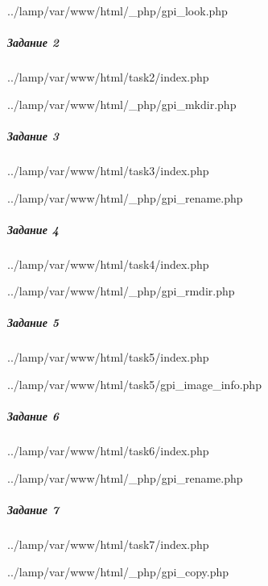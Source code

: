 
{../lamp/var/www/html/_php/gpi_look.php}


\subparagraph{Задание 2} \hspace{0pt}


{../lamp/var/www/html/task2/index.php}


{../lamp/var/www/html/_php/gpi_mkdir.php}


\subparagraph{Задание 3} \hspace{0pt}


{../lamp/var/www/html/task3/index.php}


{../lamp/var/www/html/_php/gpi_rename.php}


\subparagraph{Задание 4} \hspace{0pt}


{../lamp/var/www/html/task4/index.php}


{../lamp/var/www/html/_php/gpi_rmdir.php}


\subparagraph{Задание 5} \hspace{0pt}


{../lamp/var/www/html/task5/index.php}


{../lamp/var/www/html/task5/gpi_image_info.php}


\subparagraph{Задание 6} \hspace{0pt}


{../lamp/var/www/html/task6/index.php}


{../lamp/var/www/html/_php/gpi_rename.php}


\subparagraph{Задание 7} \hspace{0pt}


{../lamp/var/www/html/task7/index.php}


{../lamp/var/www/html/_php/gpi_copy.php}

